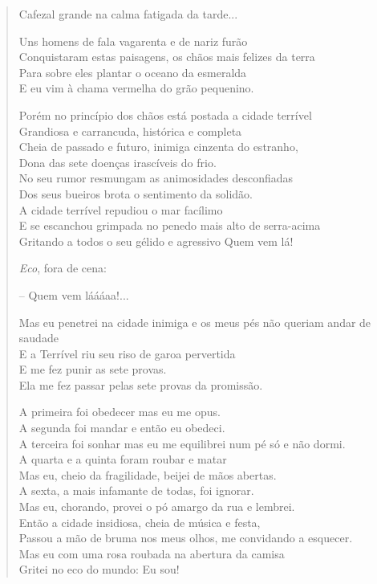 \begin{verse}
Cafezal grande na calma fatigada da tarde...

Uns homens de fala vagarenta e de nariz furão\\
Conquistaram estas paisagens, os chãos mais felizes da terra\\
Para sobre eles plantar o oceano da esmeralda\\
E eu vim à chama vermelha do grão pequenino.

Porém no princípio dos chãos está postada a cidade terrível\\
Grandiosa e carrancuda, histórica e completa\\
Cheia de passado e futuro, inimiga cinzenta do estranho,\\
Dona das sete doenças irascíveis do frio.\\
No seu rumor resmungam as animosidades desconfiadas\\
Dos seus bueiros brota o sentimento da solidão.\\
A cidade terrível repudiou o mar facílimo\\
E se escanchou grimpada no penedo mais alto de serra-acima\\
Gritando a todos o seu gélido e agressivo Quem vem lá!

\quad\quad\emph{Eco}, fora de cena:

\quad\quad\quad\quad{}-- Quem vem láááaa!...


Mas eu penetrei na cidade inimiga e os meus pés não queriam andar de saudade\\
E a Terrível riu seu riso de garoa pervertida\\
E me fez punir as sete provas.\\
Ela me fez passar pelas sete provas da promissão.

A primeira foi obedecer mas eu me opus.\\
A segunda foi mandar e então eu obedeci.\\
A terceira foi sonhar mas eu me equilibrei num pé só e não dormi.\\
A quarta e a quinta foram roubar e matar\\
Mas eu, cheio da fragilidade, beijei de mãos abertas.\\
A sexta, a mais infamante de todas, foi ignorar.\\
Mas eu, chorando, provei o pó amargo da rua e lembrei.\\
Então a cidade insidiosa, cheia de música e festa,\\
Passou a mão de bruma nos meus olhos, me convidando a esquecer.\\
Mas eu com uma rosa roubada na abertura da camisa\\
Gritei no eco do mundo: Eu sou!


\end{verse}
